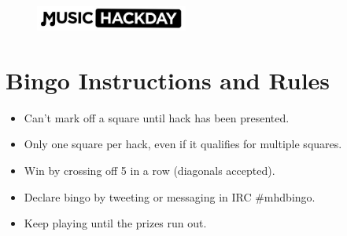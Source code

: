 


\begin{figure}[h]
    \centering
    \includegraphics[width=5cm]{./mhdlogo.jpg}
\end{figure}


\section*{Bingo Instructions and Rules}
\begin{itemize}
\setlength{\itemsep}{0pt}%
\item Can't mark off a square until hack has been presented.
\item Only one square per hack, even if it qualifies for multiple squares.
\item Win by crossing off 5 in a row (diagonals accepted).
\item Declare bingo by tweeting or messaging in IRC \#mhdbingo.
\item Keep playing until the prizes run out.
\end{itemize}

